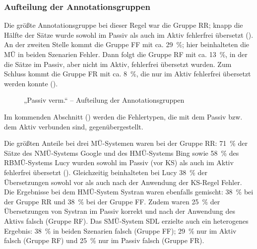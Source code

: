 \subsubsection{\label{sec:5.3.6.2}Aufteilung der Annotationsgruppen}

Die größte Annotationsgruppe bei dieser Regel war die Gruppe RR; knapp die Hälfte der Sätze wurde sowohl im Passiv als auch im Aktiv fehlerfrei übersetzt (). An der zweiten Stelle kommt die Gruppe FF mit ca. 29~\%; hier beinhalteten die MÜ in beiden Szenarien Fehler. Dann folgt die Gruppe RF mit ca. 13~\%, in der die Sätze im Passiv, aber nicht im Aktiv, fehlerfrei übersetzt wurden. Zum Schluss kommt die Gruppe FR mit ca. 8~\%, die nur im Aktiv fehlerfrei übersetzt werden konnte ().


\begin{figure}





\caption{\label{fig:05:88}„Passiv verm.“ -- Aufteilung der Annotationsgruppen   }
\end{figure}

Im kommenden Abschnitt () werden die Fehlertypen, die mit dem Passiv bzw. dem Aktiv verbunden sind, gegenübergestellt.


Die größten Anteile bei drei MÜ-Systemen waren bei der Gruppe RR: 71~\% der Sätze des NMÜ-Systems Google und des HMÜ-Systems Bing sowie 58~\% des RBMÜ-Systems Lucy wurden sowohl im Passiv (vor KS) als auch im Aktiv fehlerfrei übersetzt (). Gleichzeitig beinhalteten bei Lucy 38~\% der Übersetzungen sowohl vor als auch nach der Anwendung der KS-Regel Fehler. Die Ergebnisse bei dem HMÜ-System Systran waren ebenfalls gemischt: 38~\% bei der Gruppe RR und 38~\% bei der Gruppe FF. Zudem waren 25~\% der Übersetzungen von Systran im Passiv korrekt und nach der Anwendung des Aktivs falsch (Gruppe RF). Das SMÜ-System SDL erzielte auch ein heterogenes Ergebnis: 38~\% in beiden Szenarien falsch (Gruppe FF); 29~\% nur im Aktiv falsch (Gruppe RF) und 25~\% nur im Passiv falsch (Gruppe FR).


